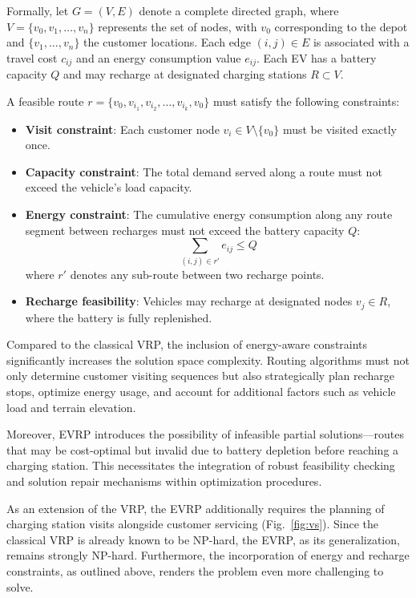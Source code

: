 Formally, let $G = (V, E)$ denote a complete directed graph, where $V = \{v_0, v_1, \dots, v_n\}$ represents the set of nodes, with $v_0$ corresponding to the depot and $\{v_1, \dots, v_n\}$ the customer locations.  
Each edge $(i, j) \in E$ is associated with a travel cost $c_{ij}$ and an energy consumption value $e_{ij}$.  
Each EV has a battery capacity $Q$ and may recharge at designated charging stations $R \subset V$.

A feasible route $r = \{v_0, v_{i_1}, v_{i_2}, \dots, v_{i_k}, v_0\}$ must satisfy the following constraints:

\begin{itemize}
    \item \textbf{Visit constraint}: Each customer node $v_i \in V \setminus \{v_0\}$ must be visited exactly once.
    \item \textbf{Capacity constraint}: The total demand served along a route must not exceed the vehicle's load capacity.
    \item \textbf{Energy constraint}: The cumulative energy consumption along any route segment between recharges must not exceed the battery capacity $Q$:
    \[
        \sum_{(i, j) \in r'} e_{ij} \leq Q
    \]
    where $r'$ denotes any sub-route between two recharge points.
    \item \textbf{Recharge feasibility}: Vehicles may recharge at designated nodes $v_j \in R$, where the battery is fully replenished.
\end{itemize}

Compared to the classical VRP, the inclusion of energy-aware constraints significantly increases the solution space complexity.  
Routing algorithms must not only determine customer visiting sequences but also strategically plan recharge stops, optimize energy usage, and account for additional factors such as vehicle load and terrain elevation.

Moreover, EVRP introduces the possibility of infeasible partial solutions—routes that may be cost-optimal but invalid due to battery depletion before reaching a charging station.  
This necessitates the integration of robust feasibility checking and solution repair mechanisms within optimization procedures.

As an extension of the VRP, the EVRP additionally requires the planning of charging station visits alongside customer servicing (Fig.~\ref{fig:vs}).  
Since the classical VRP is already known to be NP-hard, the EVRP, as its generalization, remains strongly NP-hard.  
Furthermore, the incorporation of energy and recharge constraints, as outlined above, renders the problem even more challenging to solve.

